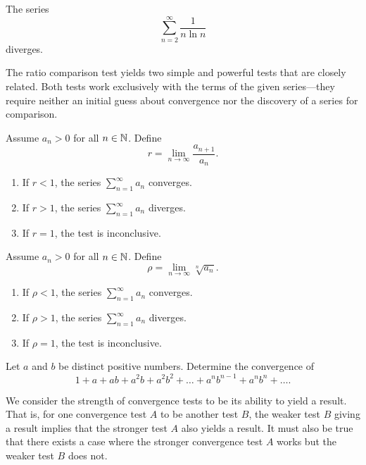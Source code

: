 \begin{example}
  The series
  \[ \sum_{n = 2}^{\infty} \frac{1}{n \ln n} \]
  diverges.
\end{example}

\begin{remark}
  The ratio comparison test yields two simple and powerful tests that
  are closely related. Both tests work exclusively with the terms of
  the given series---they require neither an initial guess about
  convergence nor the discovery of a series for comparison.
\end{remark}

\begin{proposition}
  Assume $a_n > 0$ for all $n \in \mathbb N$. Define
  \[ r = \lim_{n \to \infty} \frac{a_{n + 1}}{a_n}. \]
  \begin{enumerate}
    \item If $r < 1$, the series $\sum_{n = 1}^{\infty} a_n$ converges.
    \item If $r > 1$, the series $\sum_{n = 1}^{\infty} a_n$ diverges.
    \item If $r = 1$, the test is inconclusive.
  \end{enumerate}
\end{proposition}

\begin{proposition}
  Assume $a_n > 0$ for all $n \in \mathbb N$. Define
  \[ \rho = \lim_{n \to \infty} \sqrt[n]{a_n}. \]
  \begin{enumerate}
    \item If $\rho < 1$, the series $\sum_{n = 1}^{\infty} a_n$ converges.
    \item If $\rho > 1$, the series $\sum_{n = 1}^{\infty} a_n$ diverges.
    \item If $\rho = 1$, the test is inconclusive.
  \end{enumerate}
\end{proposition}

\begin{example}
  Let $a$ and $b$ be distinct positive numbers. Determine the convergence of
  \[ 1 + a + ab + a^2b + a^2b^2 + \dots + a^nb^{n - 1} + a^nb^n + \dots. \]
\end{example}

\begin{definition}
  We consider the strength of convergence tests to be its ability to
  yield a result. That is, for one convergence test $A$ to be
   another test $B$, the weaker test $B$
  giving a result implies that the stronger test $A$ also yields a
  result. It must also be true that there exists a case where the
  stronger convergence test $A$ works but the weaker test $B$ does not.
\end{definition}

